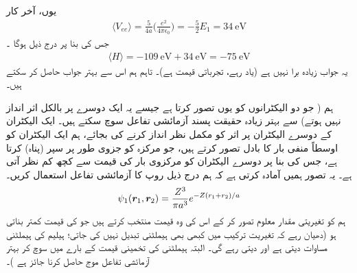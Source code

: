   یوں، آخر کار
\begin{align}\label{مساوات_تغیریتی_مخفیہ_توقعاتی_قیمت}
\langle V_{ee} \rangle=\frac{5}{4a}\big(\frac{e^{2}}{4\pi\epsilon_{0}}\big)=-\frac{5}{2}E_{1}=\SI{34}{\electronvolt} 
\end{align}
 جس کی بنا پر درج ذیل ہوگا ۔
\begin{align}
\langle H \rangle =\SI{-109}{\electronvolt}+\SI{34}{\electronvolt}=\SI{-75}{\electronvolt} 
\end{align}
یہ جواب زیادہ برا نہیں ہے (یاد رہے،  تجرباتی قیمت   ہے)۔ تاہم ہم اس سے  بہتر جواب حاصل  کر سکتے ہیں۔

ہم ( جو دو الیکٹرانوں کو یوں تصور کرتا ہے جیسے یہ  ایک دوسرے پر  بالکل اثر انداز نہیں ہوتے)  سے بہتر زیادہ حقیقت پسند   آزمائشی  تفاعل  سوچ سکتے ہیں۔ ایک الیکٹران کے  دوسرے الیکٹران پر اثر کو مکمل   نظر انداز کرنے کی بجائے،  ہم  ایک الیکٹران   کو اوسطاً  منفی بار کا بادل   تصور کرتے ہیں،  جو مرکزہ کو جزوی طور پر  سپر (پناہ)   کرتا ہے،  جس کی بنا پر دوسرے الیکٹران کو   مرکزوی بار  کی قیمت   سے کچھ کم نظر آتی ہے۔ یہ تصور  ہمیں   آمادہ کرتی ہے   کہ ہم  درج ذیل روپ کا آزمائشی  تفاعل استعمال کریں۔
\begin{align}
\psi_{1}({{\boldsymbol{r}}}_{1},{{\boldsymbol{r}}}_{2})=\frac{Z^{3}}{\pi a^{3}}e^{-Z(r_{1}+r_{2})/a} 
\end{align}
 ہم   کو تغیریتی  مقدار معلوم تصور کر کے اس کی وہ قیمت منتخب کرتے ہیں  جو   کی  قیمت کمتر بناتی ہو (دھیان رہے کہ  تغیریت  ترکیب  میں کبھی بھی ہیملٹنی  تبدیل نہیں کی جاتی؛  ہیلیم کی ہیملٹنی  مساوات    دیتی ہے اور دیتی رہے گی۔  البتہ  ہیملٹنی کی تخمینی قیمت کے بارے میں سوچ کر بہتر آزمائشی  تفاعل موج حاصل کرنا جائز ہے )۔
 
